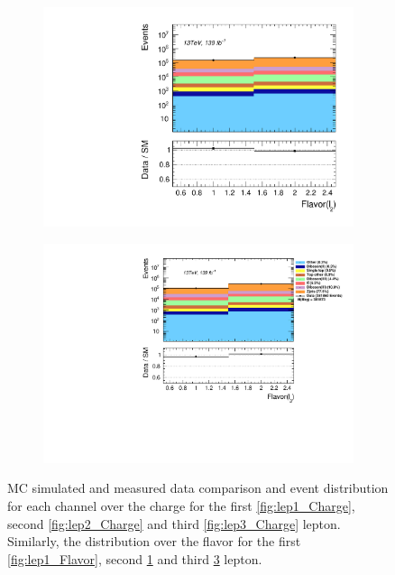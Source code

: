 \begin{figure}[H]
{\begin{subfigure}{.405\textwidth}
        \includegraphics[width=\textwidth]{Figures/FeaturesHistograms/lep2_Flavor.pdf}
        \caption{}
        \label{fig:lep2_Flavor}
    \end{subfigure}
    \hfill
    \begin{subfigure}{.525\textwidth}
        \includegraphics[width=\textwidth]{Figures/FeaturesHistograms/lep3_Flavor.pdf}
        \caption{}
        \label{fig:lep3_Flavor}
    \end{subfigure}
    }
    \caption[\ac{MC} simulated and measured data comparison and event distribution for each channel over the charge for the first,
    second and third lepton. Similarly, the distribution over the flavor for the first, second and third lepton]{\ac{MC} simulated and measured data 
    comparison and event distribution for each channel over the charge for the first \ref{fig:lep1_Charge},
    second \ref{fig:lep2_Charge} and third \ref{fig:lep3_Charge} lepton. Similarly, the distribution over the flavor
    for the first \ref{fig:lep1_Flavor}, second \ref{fig:lep2_Flavor} and third \ref{fig:lep3_Flavor} lepton.}
\end{figure}
